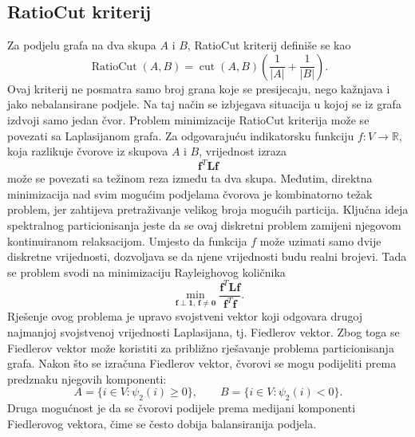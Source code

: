 \subsection{RatioCut kriterij}
Za podjelu grafa na dva skupa \(A\) i \(B\), RatioCut kriterij definiše se kao
\[
    \operatorname{RatioCut}(A,B)
    =
    \operatorname{cut}(A,B)
    \left(
        \frac{1}{|A|}
        +
        \frac{1}{|B|}
    \right).
\]
Ovaj kriterij ne posmatra samo broj grana koje se presijecaju, nego kažnjava i jako nebalansirane podjele. Na taj način se izbjegava situacija u kojoj se iz grafa izdvoji samo jedan čvor.
Problem minimizacije RatioCut kriterija može se povezati sa Laplasijanom grafa. Za odgovarajuću indikatorsku funkciju \(f:V\to\mathbb{R}\), koja razlikuje čvorove iz skupova \(A\) i \(B\), vrijednost izraza
\[
    \mathbf{f}^T \mathbf{L} \mathbf{f}
\]
može se povezati sa težinom reza između ta dva skupa. Međutim, direktna minimizacija nad svim mogućim podjelama čvorova je kombinatorno težak problem, jer zahtijeva pretraživanje velikog broja mogućih particija.
Ključna ideja spektralnog particionisanja jeste da se ovaj diskretni problem zamijeni njegovom kontinuiranom relaksacijom. Umjesto da funkcija \(f\) može uzimati samo dvije diskretne vrijednosti, dozvoljava se da njene vrijednosti budu realni brojevi. Tada se problem svodi na minimizaciju Rayleighovog količnika
\[
    \min_{\mathbf{f}\perp \mathbf{1},\, \mathbf{f}\neq \mathbf{0}}
    \frac{\mathbf{f}^T\mathbf{L}\mathbf{f}}{\mathbf{f}^T\mathbf{f}}.
\]
Rješenje ovog problema je upravo svojstveni vektor koji odgovara drugoj najmanjoj svojstvenoj vrijednosti Laplasijana, tj. Fiedlerov vektor.
Zbog toga se Fiedlerov vektor može koristiti za približno rješavanje problema particionisanja grafa. Nakon što se izračuna Fiedlerov vektor, čvorovi se mogu podijeliti prema predznaku njegovih komponenti:
\[
    A = \{i \in V : \psi_2(i) \geq 0\},
    \qquad
    B = \{i \in V : \psi_2(i) < 0\}.
\]
Druga mogućnost je da se čvorovi podijele prema medijani komponenti Fiedlerovog vektora, čime se često dobija balansiranija podjela.

